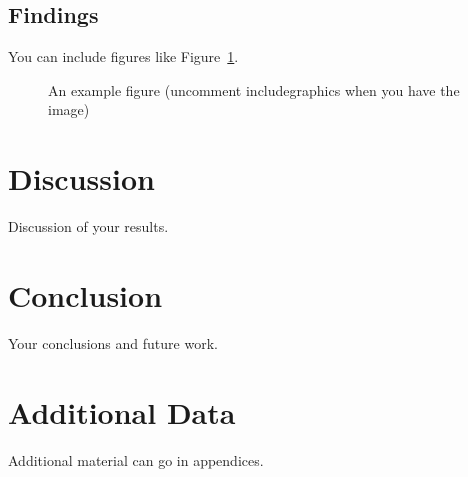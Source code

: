 \documentclass[12pt,a4paper]{report}
\begin{document}
\section{Findings}
You can include figures like Figure~\ref{fig:example}.

\begin{figure}[htbp]
    \centering
    \caption{An example figure (uncomment includegraphics when you have the image)}
    \label{fig:example}
\end{figure}

\chapter{Discussion}
\label{ch:discussion}

Discussion of your results.

\chapter{Conclusion}
\label{ch:conclusion}

Your conclusions and future work.




\appendix
\chapter{Additional Data}
\label{app:additional-data}

Additional material can go in appendices.
\end{document}
